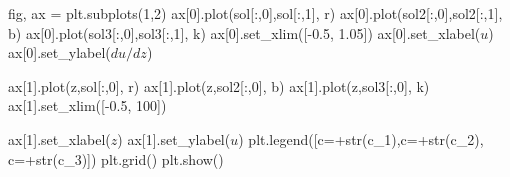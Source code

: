 \documentclass[
  letterpaper,
  DIV=11,
  numbers=noendperiod]{scrreprt}
\newenvironment{Shaded}{\begin{snugshade}}{\end{snugshade}}
\newcommand{\BuiltInTok}[1]{\textcolor[rgb]{0.00,0.23,0.31}{#1}}
\newcommand{\DecValTok}[1]{\textcolor[rgb]{0.68,0.00,0.00}{#1}}
\newcommand{\FloatTok}[1]{\textcolor[rgb]{0.68,0.00,0.00}{#1}}
\newcommand{\NormalTok}[1]{\textcolor[rgb]{0.00,0.23,0.31}{#1}}
\newcommand{\OperatorTok}[1]{\textcolor[rgb]{0.37,0.37,0.37}{#1}}
\newcommand{\StringTok}[1]{\textcolor[rgb]{0.13,0.47,0.30}{#1}}
\theoremstyle{plain}
\theoremstyle{definition}
\theoremstyle{plain}
\theoremstyle{remark}
\begin{document}
\begin{Shaded}
\begin{Highlighting}[]
\NormalTok{fig, ax }\OperatorTok{=}\NormalTok{ plt.subplots(}\DecValTok{1}\NormalTok{,}\DecValTok{2}\NormalTok{)}
\NormalTok{ax[}\DecValTok{0}\NormalTok{].plot(sol[:,}\DecValTok{0}\NormalTok{],sol[:,}\DecValTok{1}\NormalTok{], }\StringTok{\textquotesingle{}r\textquotesingle{}}\NormalTok{)}
\NormalTok{ax[}\DecValTok{0}\NormalTok{].plot(sol2[:,}\DecValTok{0}\NormalTok{],sol2[:,}\DecValTok{1}\NormalTok{], }\StringTok{\textquotesingle{}b\textquotesingle{}}\NormalTok{)}
\NormalTok{ax[}\DecValTok{0}\NormalTok{].plot(sol3[:,}\DecValTok{0}\NormalTok{],sol3[:,}\DecValTok{1}\NormalTok{], }\StringTok{\textquotesingle{}k\textquotesingle{}}\NormalTok{)}
\NormalTok{ax[}\DecValTok{0}\NormalTok{].set\_xlim([}\OperatorTok{{-}}\FloatTok{0.5}\NormalTok{, }\FloatTok{1.05}\NormalTok{])}
\NormalTok{ax[}\DecValTok{0}\NormalTok{].set\_xlabel(}\StringTok{\textquotesingle{}$u$\textquotesingle{}}\NormalTok{)}
\NormalTok{ax[}\DecValTok{0}\NormalTok{].set\_ylabel(}\StringTok{\textquotesingle{}$du/dz$\textquotesingle{}}\NormalTok{)}

\NormalTok{ax[}\DecValTok{1}\NormalTok{].plot(z,sol[:,}\DecValTok{0}\NormalTok{], }\StringTok{\textquotesingle{}r\textquotesingle{}}\NormalTok{)}
\NormalTok{ax[}\DecValTok{1}\NormalTok{].plot(z,sol2[:,}\DecValTok{0}\NormalTok{], }\StringTok{\textquotesingle{}b\textquotesingle{}}\NormalTok{)}
\NormalTok{ax[}\DecValTok{1}\NormalTok{].plot(z,sol3[:,}\DecValTok{0}\NormalTok{], }\StringTok{\textquotesingle{}k\textquotesingle{}}\NormalTok{)}
\NormalTok{ax[}\DecValTok{1}\NormalTok{].set\_xlim([}\OperatorTok{{-}}\FloatTok{0.5}\NormalTok{, }\DecValTok{100}\NormalTok{])}

\NormalTok{ax[}\DecValTok{1}\NormalTok{].set\_xlabel(}\StringTok{\textquotesingle{}$z$\textquotesingle{}}\NormalTok{)}
\NormalTok{ax[}\DecValTok{1}\NormalTok{].set\_ylabel(}\StringTok{\textquotesingle{}$u$\textquotesingle{}}\NormalTok{)}
\NormalTok{plt.legend([}\StringTok{\textquotesingle{}c=\textquotesingle{}}\OperatorTok{+}\BuiltInTok{str}\NormalTok{(c\_1),}\StringTok{\textquotesingle{}c=\textquotesingle{}}\OperatorTok{+}\BuiltInTok{str}\NormalTok{(c\_2), }\StringTok{\textquotesingle{}c=\textquotesingle{}}\OperatorTok{+}\BuiltInTok{str}\NormalTok{(c\_3)])}
\NormalTok{plt.grid()}
\NormalTok{plt.show()}
\end{Highlighting}
\end{Shaded}
\end{document}
